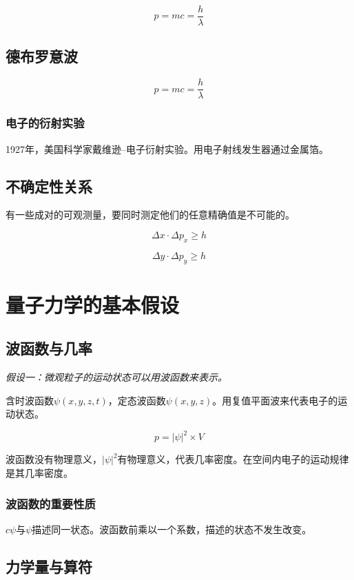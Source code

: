 \documentclass[a4paper]{ctexrep}
\begin{document}
    \[
        p = mc = \frac{h}{\lambda} 
    \]

    \subsection{德布罗意波}

    \[
        p = mc = \frac{h}{\lambda} 
    \]

    \subsubsection{电子的衍射实验}

    1927年，美国科学家戴维逊--电子衍射实验。用电子射线发生器通过金属箔。

    \subsection{不确定性关系}

    有一些成对的可观测量，要同时测定他们的任意精确值是不可能的。

    \[
        \Delta x \cdot \Delta p_x \geq h  
    \]

    \[
        \Delta y \cdot \Delta p_y \geq h  
    \]

    \section{量子力学的基本假设}

    \subsection{波函数与几率}

    \textit{假设一：微观粒子的运动状态可以用波函数来表示。}
    
    含时波函数$\psi(x, y, z, t)$，定态波函数$\psi(x, y, z)$。用复值平面波来代表电子的运动状态。

    \[
        p = |\psi|^2 \times V   
    \]

    波函数没有物理意义，$|\psi|^2$有物理意义，代表几率密度。在空间内电子的运动规律是其几率密度。

    \subsubsection{波函数的重要性质}

    $c\psi$与$\psi$描述同一状态。波函数前乘以一个系数，描述的状态不发生改变。

    \subsection{力学量与算符}
\end{document}
